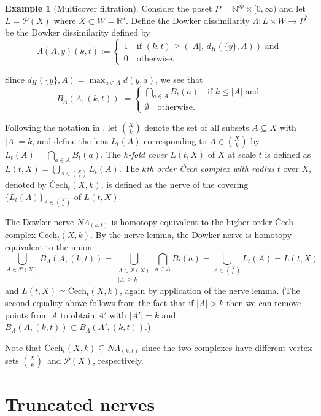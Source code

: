 \documentclass[10pt,a4paper]{article}
\theoremstyle{definition}
\newtheorem{ex}{Example}[thm]
\newcommand{\R}{\mathbb{R}}
\newcommand{\N}{\mathbb{N}}
\begin{document}
\begin{ex}[Multicover filtration]

Consider the poset $P=\N^{op}\times[0,\infty)$ and let $L=\mathcal{P}(X)$ where $X\subset W=\R^d$. Define the Dowker dissimilarity $\Lambda\colon L\times W\to P^*$ be the Dowker dissimilarity defined by
$$
\Lambda(A,y)(k,t) := \begin{cases}
	1\quad\text{if }(k,t)\geq(|A|,\,d_H(\{y\},A))\text{ and}\\
	0\quad\text{otherwise.}
\end{cases}
$$

Since $d_H(\{y\}, A)=\max_{a\in A}d(y,a)$, we see that
$$
B_\Lambda(A,(k,t)):=\begin{cases}
	\bigcap_{a\in A}B_t(a)\quad\text{if }k\leq |A| \text{ and}\\
	\emptyset\quad\text{otherwise.}
\end{cases}
$$

Following the notation in \autocite{buchet2023sparse}, let $\binom{X}{k}$ denote the set of all subsets $A\subseteq X$ with $|A|=k$, and define the lens $L_t(A)$ corresponding to $A\in\binom{X}{k}$ by $L_t(A)=\bigcap_{a\in A}B_t(a)$. The \textit{$k$-fold cover} $L(t,X)$ of $X$ at scale $t$ is defined as $L(t,X)=\bigcup_{A\in\binom{X}{k}}L_t(A)$. The \textit{$k$th order Čech complex with radius} $t$ over $X$, denoted by $\text{\v{C}ech}_t(X,k)$, is defined as the nerve of the covering $\{L_t(A)\}_{A\in\binom{X}{k}}$ of $L(t, X)$.

The Dowker nerve $N\Lambda_{(k,t)}$ is homotopy equivalent to the higher order Čech complex $\text{\v{C}ech}_t(X,k)$. By the nerve lemma, the Dowker nerve is homotopy equivalent to the union 
$$
\bigcup_{A\in\mathcal{P}(X)}B_\Lambda(A,(k,t)) = \bigcup_{\substack{A\in\mathcal{P}(X)\\|A|\geq k}}\bigcap_{a\in A}B_t(a) = \bigcup_{A\in\binom{X}{k}}L_t(A) = L(t,X)
$$
and $L(t,X)\simeq\text{\v{C}ech}_t(X,k)$, again by application of the nerve lemma. (The second equality above follows from the fact that if $|A|>k$ then we can remove points from $A$ to obtain $A'$ with $|A'|=k$ and $B_\Lambda(A,(k,t))\subset B_\Lambda(A',(k,t))$.)

Note that $\text{\v{C}ech}_t(X,k)\subsetneq N\Lambda_{(k,t)}$ since the two complexes have different vertex sets $\binom{X}{k}$ and $\mathcal{P}(X)$, respectively.

\end{ex}


\section{Truncated nerves}
\end{document}
